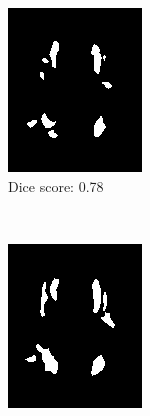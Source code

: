 \documentclass[10pt,twoside]{book}
\begin{document}
\begin{figure}
\begin{subfigure}{0.32\textwidth}
    \includegraphics[width=\textwidth]{segmentation2}
    \caption{Dice score: 0.78}
    \label{fig:Dice_b}
  \end{subfigure}
  \\[2ex]
  \begin{subfigure}{0.32\textwidth}
    \centering
    \includegraphics[width=\textwidth]{segmentation3}

\end{subfigure}
\end{figure}
\end{document}
